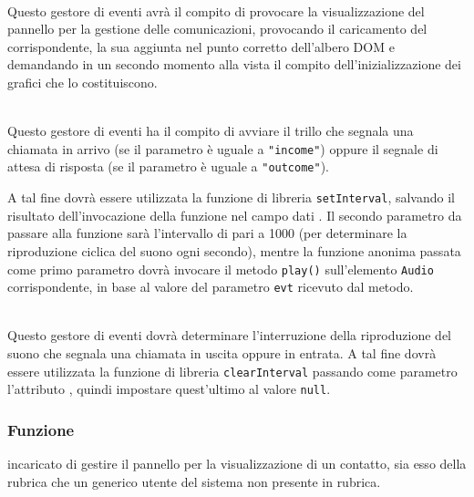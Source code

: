 \begin{description}
  \item{}\\
  Questo gestore di eventi avrà il compito di provocare la visualizzazione del pannello per la gestione delle comunicazioni, provocando il caricamento del  corrispondente, la sua aggiunta nel punto corretto dell'albero DOM e demandando in un secondo momento alla vista il compito dell'inizializzazione dei  grafici che lo costituiscono.
  
  \item{}\\
  Questo gestore di eventi ha il compito di avviare il trillo che segnala una chiamata in arrivo (se il parametro è uguale a \verb'"income"') oppure il segnale di attesa di risposta (se il parametro è uguale a \verb'"outcome"').
  
  A tal fine dovrà essere utilizzata la funzione di libreria \verb'setInterval', salvando il risultato dell'invocazione della funzione nel campo dati . Il secondo parametro da passare alla funzione sarà l'intervallo di  pari a 1000 (per determinare la riproduzione ciclica del suono ogni secondo), mentre la funzione anonima passata come primo parametro dovrà invocare il metodo \verb'play()' sull'elemento \verb'Audio' corrispondente, in base al valore del parametro \verb'evt' ricevuto dal metodo.
  
  \item{}\\
  Questo gestore di eventi dovrà determinare l'interruzione della riproduzione del suono che segnala una chiamata in uscita oppure in entrata. A tal fine dovrà essere utilizzata la funzione di libreria \verb'clearInterval' passando come parametro l'attributo , quindi impostare quest'ultimo al valore \verb'null'.

\end{description}



\subsubsection*{Funzione}
 incaricato di gestire il pannello per la visualizzazione di un contatto, sia esso della rubrica che un generico utente del sistema non presente in rubrica.

